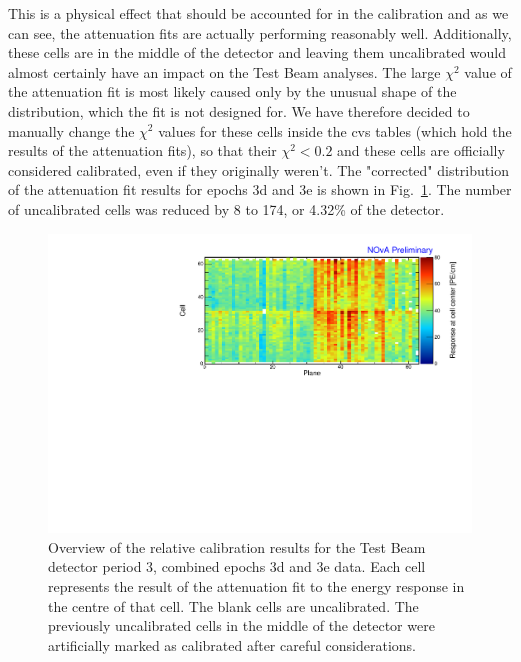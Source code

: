 This is a physical effect that should be accounted for in the calibration and as we can see, the attenuation fits are actually performing reasonably well. Additionally, these cells are in the middle of the detector and leaving them uncalibrated would almost certainly have an impact on the Test Beam analyses. The large $\chi^2$ value of the attenuation fit is most likely caused only by the unusual shape of the distribution, which the fit is not designed for. We have therefore decided to manually change the $\chi^2$ values for these cells inside the cvs tables (which hold the results of the attenuation fits), so that their $\chi^2<0.2$ and these cells are officially considered calibrated, even if they originally weren't. The "corrected" distribution of the attenuation fit results for epochs 3d and 3e is shown in Fig.~\ref{fig:CellCentreResponseEp3de_updated}. The number of uncalibrated cells was reduced by 8 to 174, or 4.32\% of the detector.

\begin{figure}[!hbtp]
\centering
\includegraphics[width=\textwidth]{Plots/TBCalibration/CellResponseAtCentre_epoch3de_Limited_NOvAPlotStyle.pdf}
\caption[Corrected map of fitted response at cell centre for epochs 3d and 3e data]{Overview of the relative calibration results for the Test Beam detector period 3, combined epochs 3d and 3e data. Each cell represents the result of the attenuation fit to the energy response in the centre of that cell. The blank cells are uncalibrated. The previously uncalibrated cells in the middle of the detector were artificially marked as calibrated after careful considerations.}
\label{fig:CellCentreResponseEp3de_updated}
\end{figure}

